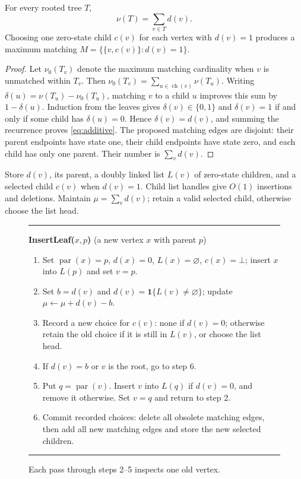 \documentclass[runningheads,envcountsame,orivec]{llncs}
\newcommand{\ind}{\mathbf 1}
\newcommand{\ch}{\operatorname{ch}}
\newcommand{\parnt}{\operatorname{par}}
\newcommand{\nil}{\bot}
\begin{document}
\begin{lemma}\label{lem:static}
For every rooted tree $T$,
\begin{equation}\label{eq:additive}
 \nu(T)=\sum_{v\in T}d(v).
\end{equation}
Choosing one zero-state child $c(v)$ for each vertex with $d(v)=1$
produces a maximum matching
$M=\{\{v,c(v)\}:d(v)=1\}$.
\end{lemma}
\begin{proof}
Let $\nu_0(T_v)$ denote the maximum matching cardinality when $v$ is
unmatched within $T_v$. Then
$\nu_0(T_v)=\sum_{u\in\ch(v)}\nu(T_u)$.
Writing $\delta(u)=\nu(T_u)-\nu_0(T_u)$, matching $v$ to a child $u$
improves this sum by $1-\delta(u)$. Induction from the leaves gives
$\delta(v)\in\{0,1\}$ and
$\delta(v)=1$ if and only if some child has $\delta(u)=0$. Hence
$\delta(v)=d(v)$, and summing the recurrence proves
\eqref{eq:additive}. The proposed matching edges are disjoint: their
parent endpoints have state one, their child endpoints have state zero,
and each child has only one parent. Their number is $\sum_vd(v)$.
\end{proof}

Store $d(v)$, its parent, a doubly linked list $L(v)$ of zero-state
children, and a selected child $c(v)$ when $d(v)=1$. Child list handles
give $O(1)$ insertions and deletions. Maintain $\mu=\sum_vd(v)$;
retain a valid selected child, otherwise choose the list head.

\begin{figure}[t]
\hrule\smallskip
\textbf{InsertLeaf($x,p$)} \quad (a new vertex $x$ with parent $p$)
\begin{enumerate}
\setlength{\itemsep}{1pt}
\item Set $\parnt(x)=p$, $d(x)=0$, $L(x)=\varnothing$, $c(x)=\nil$;
      insert $x$ into $L(p)$ and set $v=p$.
\item Set $b=d(v)$ and $d(v)=\ind\{L(v)\ne\varnothing\}$;
      update $\mu\gets\mu+d(v)-b$.
\item Record a new choice for $c(v)$: none if $d(v)=0$; otherwise retain
      the old choice if it is still in $L(v)$, or choose the list head.
\item If $d(v)=b$ or $v$ is the root, go to step 6.
\item Put $q=\parnt(v)$. Insert $v$ into $L(q)$ if $d(v)=0$, and remove
      it otherwise. Set $v=q$ and return to step 2.
\item Commit recorded choices: delete all obsolete matching edges,
      then add all new matching edges and store the new selected children.
\end{enumerate}
\smallskip\hrule
\caption{Each pass through steps 2--5 inspects one old vertex.}
\label{fig:algorithm}
\end{figure}
\end{document}

